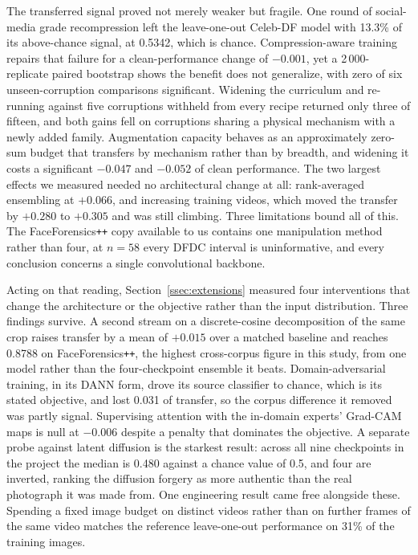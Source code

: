 \documentclass[journal,onecolumn]{IEEEtran}
\newcommand{\celebdf}{Celeb-DF}
\newcommand{\dfdc}{DFDC}
\begin{document}
The transferred signal proved not merely weaker but fragile. One round of
social-media grade recompression left the leave-one-out \celebdf{} model with
13.3\% of its above-chance signal, at 0.5342, which is chance. Compression-aware
training repairs that failure for a clean-performance change of $-0.001$, yet a
2\,000-replicate paired bootstrap shows the benefit does not generalize, with
zero of six unseen-corruption comparisons significant. Widening the curriculum
and re-running against five corruptions withheld from every recipe returned only
three of fifteen, and both gains fell on corruptions sharing a physical mechanism
with a newly added family. Augmentation capacity behaves as an approximately
zero-sum budget that transfers by mechanism rather than by breadth, and widening
it costs a significant $-0.047$ and $-0.052$ of clean performance. The two largest
effects we measured needed no architectural change at all: rank-averaged
ensembling at $+0.066$, and increasing training videos, which moved the transfer by
$+0.280$ to $+0.305$ and was still climbing. Three limitations bound all of this.
The FaceForensics\texttt{++} copy available to us contains one manipulation
method rather than four, at $n = 58$ every \dfdc{} interval is uninformative, and
every conclusion concerns a single convolutional backbone.

Acting on that reading, Section~\ref{ssec:extensions} measured four
interventions that change the architecture or the objective rather than the input
distribution. Three findings survive. A second stream on a discrete-cosine
decomposition of the same crop raises transfer by a mean of $+0.015$ over a
matched baseline and reaches 0.8788 on FaceForensics\texttt{++}, the highest
cross-corpus figure in this study, from one model rather than the four-checkpoint
ensemble it beats. Domain-adversarial training, in its DANN form, drove its source
classifier to chance, which is its stated objective, and lost 0.031 of transfer, so the corpus
difference it removed was partly signal. Supervising attention with the
in-domain experts' Grad-CAM maps is null at $-0.006$ despite a penalty that
dominates the objective. A separate probe against latent diffusion is the
starkest result: across all nine checkpoints in the project the median is 0.480
against a chance value of 0.5, and four are inverted, ranking the diffusion
forgery as more authentic than the real photograph it was made from. One
engineering result came free alongside these. Spending a fixed image budget on
distinct videos rather than on further frames of the same video matches the
reference leave-one-out performance on 31\% of the training images.
\end{document}
